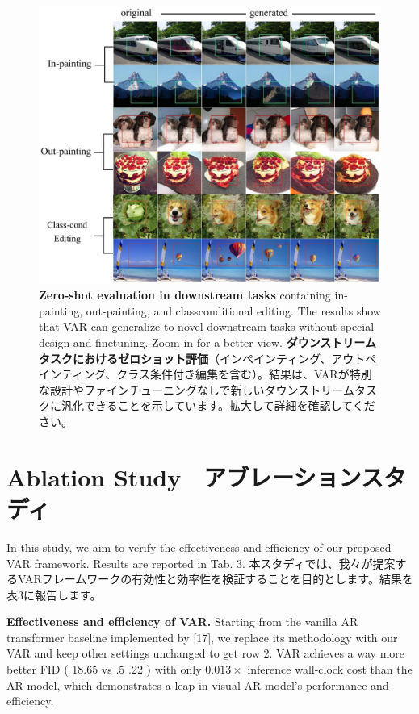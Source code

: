 \documentclass{article}
\begin{document}
\begin{figure}[h]
\begin{center}
  \includegraphics[width=\textwidth]{2025_10_26_62f95e615e8879e267a8g-11}
\caption{\textbf{Zero-shot evaluation in downstream tasks} containing in-painting, out-painting, and classconditional editing. The results show that VAR can generalize to novel downstream tasks without special design and finetuning. Zoom in for a better view.
\textbf{ダウンストリームタスクにおけるゼロショット評価}（インペインティング、アウトペインティング、クラス条件付き編集を含む）。結果は、VARが特別な設計やファインチューニングなしで新しいダウンストリームタスクに汎化できることを示しています。拡大して詳細を確認してください。
}
\end{center}
\end{figure}

\section{Ablation Study　アブレーションスタディ}
In this study, we aim to verify the effectiveness and efficiency of our proposed VAR framework. Results are reported in Tab. 3.
本スタディでは、我々が提案するVARフレームワークの有効性と効率性を検証することを目的とします。結果を表3に報告します。


\textbf{Effectiveness and efficiency of VAR.} Starting from the vanilla AR transformer baseline implemented by [17], we replace its methodology with our VAR and keep other settings unchanged to get row 2. VAR achieves a way more better FID ( 18.65 vs .5 .22 ) with only $0.013 \times$ inference wall-clock cost than the AR model, which demonstrates a leap in visual AR model's performance and efficiency.
\end{document}
